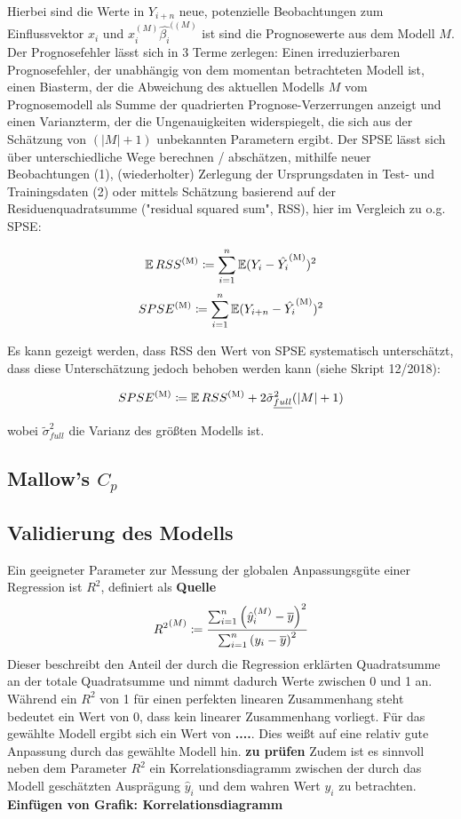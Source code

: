     	Hierbei sind die Werte in $Y_{i+n}$ neue, potenzielle Beobachtungen zum Einflussvektor $x_i$ und $x_{i}^{(M)}\hat{\beta_i}^{((M)}$ ist sind die Prognosewerte aus dem Modell $M$.
    	Der Prognosefehler lässt sich in 3 Terme zerlegen: Einen irreduzierbaren Prognosefehler, der unabhängig von dem momentan betrachteten Modell ist, einen Biasterm, der die Abweichung des aktuellen Modells $M$ vom Prognosemodell als Summe der quadrierten Prognose-Verzerrungen anzeigt und einen Varianzterm, der die Ungenauigkeiten widerspiegelt, die sich aus der Schätzung von $(|M|+1)$ unbekannten Parametern ergibt.
    	Der SPSE lässt sich über unterschiedliche Wege berechnen / abschätzen, mithilfe neuer Beobachtungen (1), (wiederholter) Zerlegung der Ursprungsdaten in Test- und Trainingsdaten (2) oder mittels Schätzung basierend auf der Residuenquadratsumme ("residual squared sum", RSS), hier im Vergleich zu o.g. SPSE:
    
    	\[
    	    \operatorname{\mathbb{E}} RSS^{\mathrm{(M)}} \coloneqq \sum_{i=1}^{n} \operatorname{\mathbb{E}} (Y_{i} - \hat{Y_i}^{\mathrm{(M)}})^2
    	\]
    	\[
    	    SPSE^{\mathrm{(M)}} \coloneqq \sum_{i=1}^{n} \operatorname{\mathbb{E}} (Y_{i+n} - \hat{Y_i}^{\mathrm{(M)}})^2
    	\]
    
    	Es kann gezeigt werden, dass RSS den Wert von SPSE systematisch unterschätzt, dass diese Unterschätzung jedoch behoben werden kann (siehe Skript 12/2018):
    
        \[
    	    SPSE^{\mathrm{(M)}} \coloneqq \operatorname{\mathbb{E}} RSS^{\mathrm{(M)}} + 2\tilde{\sigma}_{\underline{full}}^2(|M|+1)
        \]
    
        wobei $\tilde{\sigma}_{full}^2$ die Varianz des größten Modells ist.


	\subsection{Mallow's $C_{p}$}
	\label{ssec:mallows-C_p}



	\subsection{Validierung des Modells}
	\label{ssec:model-validation}
        Ein geeigneter Parameter zur Messung der globalen Anpassungsgüte einer Regression ist $R^2$, definiert als \textbf{Quelle}
        \[
            {R^2}^{(M)} \coloneqq \frac {\sum_{i=1}^n \left( \hat{y}^{(M)}_i - \overline{y} \right)^2}{\sum_{i=1}^n \left( y_i - \overline{y} \right)^2}
        \]
        Dieser beschreibt den Anteil der durch die Regression erklärten Quadratsumme an der totale Quadratsumme und nimmt dadurch Werte zwischen 0 und 1 an.
        Während ein $R^2$ von 1 für einen perfekten linearen Zusammenhang steht bedeutet ein Wert von 0, dass kein linearer Zusammenhang vorliegt.
        Für das gewählte Modell ergibt sich ein Wert von \textbf{....}.
        Dies weißt auf eine relativ gute Anpassung durch das gewählte Modell hin. \textbf{zu prüfen}
        Zudem ist es sinnvoll neben dem Parameter $R^2$ ein Korrelationsdiagramm zwischen der durch das Modell geschätzten Ausprägung $\hat{y}_i$ und dem wahren Wert $y_i$ zu betrachten.
        \textbf{Einfügen von Grafik: Korrelationsdiagramm}
    
